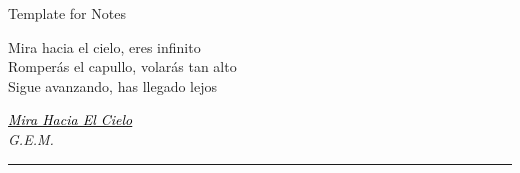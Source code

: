 \documentclass{note}
\begin{document}
\clearpage

\thispagestyle{empty}
\clearpage

\begin{titlepage}
\thispagestyle{empty} %
\noindent
\titlefont Template for Notes\par
\epigraph{Mira hacia el cielo, eres infinito\\
Romperás el capullo, volarás tan alto\\
Sigue avanzando, has llegado lejos}%
{\textit{\href{https://cn.iamgem.com/revelacion/}{\textcolor{black}{Mira Hacia El Cielo}}\\ \textsc{G.E.M.}}}
\null\vfill
\vspace*{1cm}
\noindent
\hfill
\begin{minipage}{0.5\linewidth}
    \begin{flushright}
        \printauthor
    \end{flushright}
\end{minipage}
%
\begin{minipage}{0.02\linewidth}
    \rule{1pt}{60pt}
\end{minipage}
\titlepagedecoration

\clearpage
~
\thispagestyle{empty}
\clearpage

\end{titlepage}

{
    \hypersetup{linkcolor=red!65!black} %
    \tableofcontents
}

\frontmatter
\end{document}
